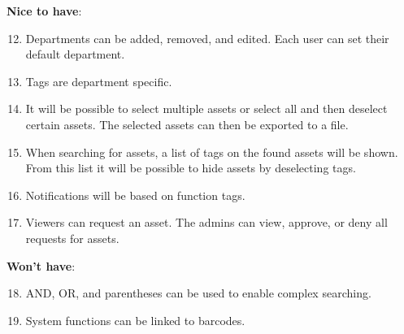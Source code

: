 \textbf{Nice to have}:
\begin{enumerate}
\setcounter{enumi}{11}
    \item Departments can be added, removed, and edited. Each user can set their default department.
    
    \item Tags are department specific.
    
    \item It will be possible to select multiple assets or select all and then deselect certain assets. The selected assets can then be exported to a file. 
    
    \item When searching for assets, a list of tags on the found assets will be shown. From this list it will be possible to hide assets by deselecting tags.    
    
    \item Notifications will be based on function tags.
    
    \item Viewers can request an asset. The admins can view, approve, or deny all requests for assets. 
\end{enumerate}
    
\textbf{Won't have}:
\begin{enumerate}
\setcounter{enumi}{17}
    \item AND, OR, and parentheses can be used to enable complex searching.
    
    \item System functions can be linked to barcodes. 
\end{enumerate}
